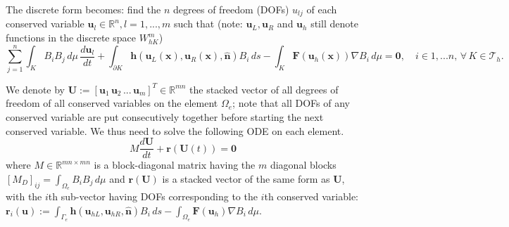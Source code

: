 \documentclass[11pt]{article}
\let\bld\boldsymbol
\begin{document}
The discrete form becomes: find the $n$ degrees of freedom (DOFs) $u_{lj}$ of each conserved variable $\bld{u}_l \in \mathbb{R}^n, l=1,...,m$ such that (note: $\bld{u}_L, \bld{u}_R$ and $\bld{u}_h$ still denote functions in the discrete space $W_{hK}^m$)
\begin{equation}
\sum_{j=1}^n\int_{K} B_iB_j\,d\mu\, \frac{d\bld{u}_{l}}{d t} + \int_{\partial K}  \bld{h}(\bld{u}_L(\bld{x}), \bld{u}_R(\bld{x}), \hat{\bld{n}})B_i \,ds - \int_{K}\bld{F}(\bld{u}_h(\bld{x}))\nabla B_i \,d\mu = \bld{0}, \quad i \in {1,...n},\, \forall \,K \in \mathcal{T}_h.
\label{df}
\end{equation}

We denote by $\bld{U} := [\bld{u}_1\, \bld{u}_2\, ...\, \bld{u}_m]^T \in \mathbb{R}^{mn}$ the stacked vector of all degrees of freedom of all conserved variables on the element $\Omega_e$; note that all DOFs of any conserved variable are put consecutively together before starting the next conserved variable. We thus need to solve the following ODE on each element.
\begin{equation}
M \frac{d\bld{U}}{dt} + \bld{r}(\bld{U}(t)) = \bld{0}
\label{ode}
\end{equation}
where $M \in \mathbb{R}^{mn\times mn}$ is a block-diagonal matrix having the $m$ diagonal blocks $[M_D]_{ij} = \int_{\Omega_e} B_iB_j\,d\mu$ and $\bld{r}(\bld{U})$ is a stacked vector of the same form as $\bld{U}$, with the $i$th sub-vector having DOFs corresponding to the $i$th conserved variable: $\bld{r}_i(\bld{u}) :=  \int_{\Gamma_e}  \bld{h}(\bld{u}_{hL}, \bld{u}_{hR}, \hat{\bld{n}})B_i \,ds - \int_{\Omega_e}\bld{F}(\bld{u}_h)\nabla B_i \,d\mu$.
\end{document}
